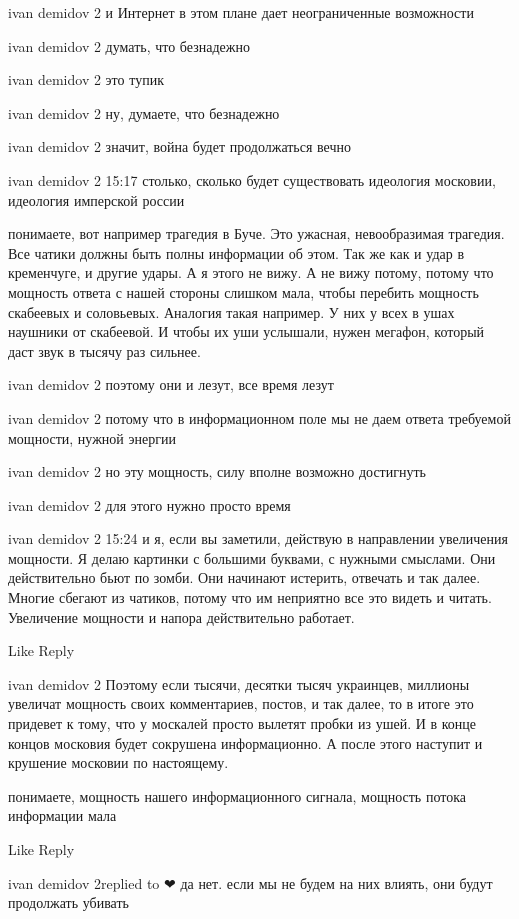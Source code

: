 ivan demidov 2
и Интернет в этом плане дает неограниченные возможности

ivan demidov 2
думать, что безнадежно

ivan demidov 2
это тупик

ivan demidov 2
ну, думаете, что безнадежно

ivan demidov 2
значит, война будет продолжаться вечно

ivan demidov 2
15:17
столько, сколько будет существовать идеология московии, идеология имперской россии

понимаете, вот например трагедия в Буче. Это ужасная, невообразимая трагедия. Все чатики должны быть полны информации об этом. Так же как и удар в кременчуге, и другие удары. А я этого не вижу. А не вижу потому, потому что мощность ответа с нашей стороны слишком мала, чтобы перебить мощность скабеевых и соловьевых. Аналогия такая например. У них у всех в ушах наушники от скабеевой. И чтобы их уши услышали, нужен мегафон, который даст звук в тысячу раз сильнее.

ivan demidov 2
поэтому они и лезут, все время лезут

ivan demidov 2
потому что в информационном поле мы не даем ответа требуемой мощности, нужной энергии

ivan demidov 2
но эту мощность, силу вполне возможно достигнуть

ivan demidov 2
для этого нужно просто время

ivan demidov 2
15:24
и я, если вы заметили, действую в направлении увеличения мощности. Я делаю картинки с большими буквами, с нужными смыслами. Они действительно бьют по зомби. Они начинают истерить, отвечать и так далее. Многие сбегают из чатиков, потому что им неприятно все это видеть и читать. Увеличение мощности и напора действительно работает.

    Like
    Reply

ivan demidov 2
Поэтому если тысячи, десятки тысяч украинцев, миллионы увеличат мощность своих комментариев, постов, и так далее, то в итоге это придевет к тому, что у москалей просто вылетят пробки из ушей. И в конце концов московия будет сокрушена информационно. А после этого наступит и крушение московии по настоящему.

понимаете, мощность нашего информационного сигнала, мощность потока информации мала

    Like
    Reply

ivan demidov 2replied to ❤
да нет. если мы не будем на них влиять, они будут продолжать убивать

